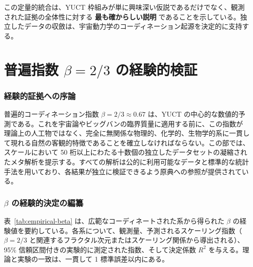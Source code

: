 \documentclass[11pt,a4paper]{article}
\begin{document}
	この定量的統合は、YUCT 枠組みが単に興味深い仮説であるだけでなく、観測された証拠の全体性に対する \textbf{最も確からしい説明} であることを示している。独立したデータの収斂は、宇宙動力学のコーディネーション起源を決定的に支持する。
	
	
	\part{普遍指数 \(\beta = 2/3\) の経験的検証}
	\label{part:V}
	
	\section{経験的証拠への序論}
	
	普遍的コーディネーション指数 \(\beta = 2/3 \approx 0.67\) は、YUCT の中心的な数値的予測である。これを宇宙論やビッグバンの臨界質量に適用する前に、この指数が理論上の人工物ではなく、完全に無関係な物理的、化学的、生物学的系に一貫して現れる自然の客観的特徴であることを確立しなければならない。この部では、スケールにおいて 50 桁以上にわたる十数個の独立したデータセットの凝縮されたメタ解析を提示する。すべての解析は公的に利用可能なデータと標準的な統計手法を用いており、各結果が独立に検証できるよう原典への参照が提供されている。
	
	\section{\(\beta\) の経験的決定の編纂}
	
	表~\ref{tab:empirical-beta} は、広範なコーディネートされた系から得られた \(\beta\) の経験値を要約している。各系について、観測量、予測されるスケーリング指数（\(\beta = 2/3\) と関連するフラクタル次元またはスケーリング関係から導出される）、95\% 信頼区間付きの実験的に測定された指数、そして決定係数 \(R^2\) を与える。理論と実験の一致は、一貫して 1 標準誤差以内にある。
	
\end{document}
